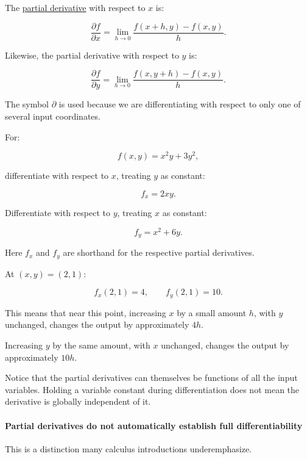 The \hyperref[02-foundations-ii-ch021-multivariable-derivatives-and-sensitivity-1]{partial derivative} with respect to \(x\) is:

\[
\frac{\partial f}{\partial x} = \lim_{h\to0} \frac{f(x+h,y)-f(x,y)}h.
\]

Likewise, the partial derivative with respect to \(y\) is:

\[
\frac{\partial f}{\partial y} = \lim_{h\to0} \frac{f(x,y+h)-f(x,y)}h.
\]

The symbol \(\partial\) is used because we are differentiating with respect to only one of several input coordinates.

For:

\[
f(x,y)=x^2y+3y^2,
\]

differentiate with respect to \(x\), treating \(y\) as constant:

\[
\boxed{f_x=2xy}.
\]

Differentiate with respect to \(y\), treating \(x\) as constant:

\[
\boxed{f_y=x^2+6y}.
\]

Here \(f_x\) and \(f_y\) are shorthand for the respective partial derivatives.

At \((x,y)=(2,1)\):

\[
f_x(2,1)=4, \qquad f_y(2,1)=10.
\]

This means that near this point, increasing \(x\) by a small amount \(h\), with \(y\) unchanged, changes the output by approximately \(4h\).

Increasing \(y\) by the same amount, with \(x\) unchanged, changes the output by approximately \(10h\).

Notice that the partial derivatives can themselves be functions of all the input variables. Holding a variable constant during differentiation does not mean the derivative is globally independent of it.

\paragraph{Partial derivatives do not automatically establish full differentiability}\label{02-foundations-ii-ch021-partial-derivatives-do-not-automatically-establish-full-differentiability}

\hypertarget{02-foundations-ii-ch021-partial-derivatives-do-not-automatically-establish-full-differentiability}{}

This is a distinction many calculus introductions underemphasize.

